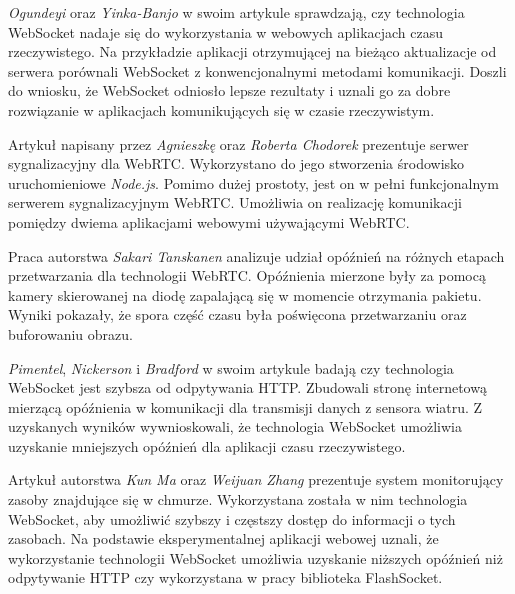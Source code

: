 \documentclass[language=polish,type=master]{aghmodern}
\begin{document}
\emph{Ogundeyi} oraz \emph{Yinka-Banjo} w swoim artykule \cite{websocket_realtime} sprawdzają, czy technologia WebSocket nadaje się do wykorzystania w webowych aplikacjach czasu rzeczywistego.
Na przykładzie aplikacji otrzymującej na bieżąco aktualizacje od serwera porównali WebSocket z konwencjonalnymi metodami komunikacji.
Doszli do wniosku, że WebSocket odniosło lepsze rezultaty i uznali go za dobre rozwiązanie w aplikacjach komunikujących się w czasie rzeczywistym.

Artykuł \cite{webrtc_signaling} napisany przez \emph{Agnieszkę} oraz \emph{Roberta Chodorek} prezentuje serwer sygnalizacyjny dla WebRTC.
Wykorzystano do jego stworzenia środowisko uruchomieniowe \emph{Node.js}.
Pomimo dużej prostoty, jest on w pełni funkcjonalnym serwerem sygnalizacyjnym WebRTC.
Umożliwia on realizację komunikacji pomiędzy dwiema aplikacjami webowymi używającymi WebRTC.

Praca \cite{webrtc_latency} autorstwa \emph{Sakari Tanskanen} analizuje udział opóźnień na różnych etapach przetwarzania dla technologii WebRTC.
Opóźnienia mierzone były za pomocą kamery skierowanej na diodę zapalającą się w momencie otrzymania pakietu.
Wyniki pokazały, że spora część czasu była poświęcona przetwarzaniu oraz buforowaniu obrazu.

\emph{Pimentel}, \emph{Nickerson} i \emph{Bradford} w swoim artykule \cite{websocket_sensor} badają czy technologia WebSocket jest szybsza od odpytywania HTTP.
Zbudowali stronę internetową mierzącą opóźnienia w komunikacji dla transmisji danych z sensora wiatru.
Z uzyskanych wyników wywnioskowali, że technologia WebSocket umożliwia uzyskanie mniejszych opóźnień dla aplikacji czasu rzeczywistego.

Artykuł \cite{websocket_monitoring} autorstwa \emph{Kun Ma} oraz \emph{Weijuan Zhang} prezentuje system monitorujący zasoby znajdujące się w chmurze.
Wykorzystana została w nim technologia WebSocket, aby umożliwić szybszy i częstszy dostęp do informacji o tych zasobach.
Na podstawie eksperymentalnej aplikacji webowej uznali, że wykorzystanie technologii WebSocket umożliwia uzyskanie niższych opóźnień niż odpytywanie HTTP czy wykorzystana w pracy biblioteka FlashSocket.
\end{document}
